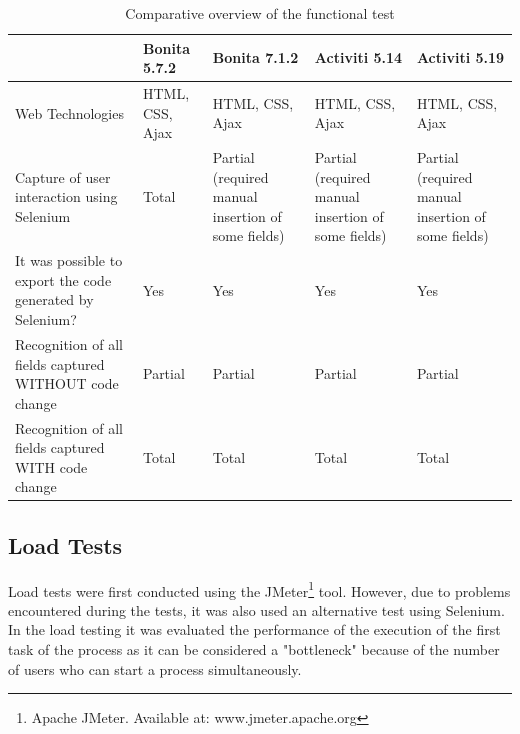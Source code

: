 \documentclass[runningheads,a4paper]{llncs}
\begin{document}
\begin{table}
\centering
\begin{center}
\begin{tabular}{p{3cm}|p{2cm}|p{2.5cm}|p{2.5cm}|p{2.5cm}}
\hline
 & Bonita 5.7.2 & Bonita 7.1.2 & Activiti 5.14 & Activiti 5.19 \\\hline
Web Technologies & HTML, CSS, Ajax & HTML, CSS, Ajax & HTML, CSS, Ajax & HTML, CSS, Ajax \\\hline
Capture of user interaction using Selenium & Total & Partial (required manual insertion of some fields) & Partial (required manual insertion of some fields) & Partial (required manual insertion of some fields) \\\hline
It was possible to export the code generated by Selenium? & Yes & Yes & Yes & Yes\\\hline
Recognition of all fields captured WITHOUT code change & Partial & Partial & Partial & Partial \\\hline
Recognition of all fields captured WITH code change & Total & Total & Total & Total \\\hline
\end{tabular}
\caption{Comparative overview of the functional test}
\label{tab:testeFuncional}
\end{center}
\end{table}


\subsection{Load Tests}

Load tests were first conducted using the JMeter\footnote{Apache JMeter. Available at: www.jmeter.apache.org} tool. However, due to problems encountered during the tests, it was also used an alternative test using Selenium. In the load testing it was evaluated the performance of the execution of the first task of the process as it can be considered a "bottleneck" because of the number of users who can start a process simultaneously.
\end{document}
